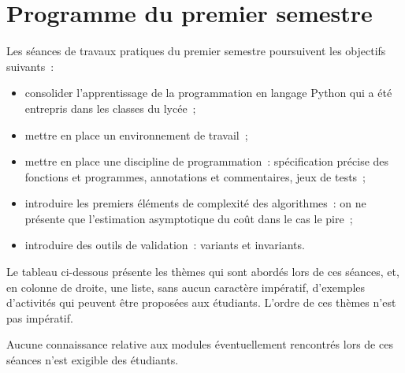 \section{Programme du premier semestre}

Les séances de travaux pratiques du premier semestre poursuivent les objectifs suivants~: 
\begin{itemize}
\item consolider l'apprentissage de la programmation en langage Python qui a été entrepris dans les classes du lycée~;
\item mettre en place un environnement de travail~;
\item mettre en place une discipline de programmation~: spécification précise des fonctions et programmes, annotations et commentaires, jeux de tests~;
\item introduire les premiers éléments de complexité des algorithmes~: on ne présente que l'estimation asymptotique du coût dans le cas le pire~;
\item introduire des outils de validation~: variants et invariants.
\end{itemize}
\medskip




Le tableau ci-dessous présente les thèmes qui sont abordés lors de ces séances, et, en colonne de droite, une liste, sans aucun caractère impératif, d'exemples d'activités
qui peuvent être proposées aux étudiants. L'ordre de ces thèmes n'est pas impératif.
\medskip

Aucune connaissance relative aux modules éventuellement rencontrés lors de ces séances n'est exigible des étudiants.


\medskip

